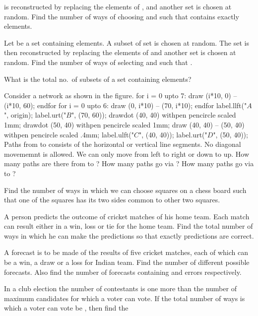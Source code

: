    is reconstructed by replacing the elements of , and another set  is chosen at random. Find
  the number of ways of choosing  and  such that  contains exactly  elements.
\item Let  be a set containing  elements. A subset  of set  is chosen at random. The set
   is then reconstructed by replacing the elements of  and another set  is chosen at
  random. Find the number of ways of selecting  and  such that .
\item What is the total no.\ of subsets of a set containing  elements?
\item Consider a network as shown in the figure.
  \startplacefigure[location={left,none}]
    \startMPcode
      for i = 0 upto 7:
          draw (i*10, 0) -- (i*10, 60);
      endfor
      for i = 0 upto 6:
          draw (0, i*10) -- (70, i*10);
      endfor
      label.llft("$A$", origin);
      label.urt("$B$", (70, 60));
      drawdot (40, 40) withpen pencircle scaled 1mm;
      drawdot (50, 40) withpen pencircle scaled 1mm;
      draw (40, 40) -- (50, 40) withpen pencircle scaled .4mm;
      label.ulft("$C$", (40, 40));
      label.urt("$D$", (50, 40));
    \stopMPcode
  \stopplacefigure
  Paths from  to  consists of the horizontal or vertical line segments. No diagonal movememnt is
  allowed. We can only move from left to right or down to up. How many paths are
  there from  to ? How many paths go via ? How many paths go via  to ?
\vskip 1cm
\item Find the number of ways in which we can choose  squares on a chess board such that one of the
  squares has its two sides common to other two squares.
\item A person predicts the outcome of  cricket matches of his home team. Each match can result either
  in a win, loss or tie for the home team. Find the total number of ways in which he can make the
  predictions so that exactly  predictions
  are correct.
\item A forecast is to be made of the results of five cricket matches, each of which can be a win, a draw or
  a loss for Indian team. Find the number of different possible forecasts. Also find the number of forecasts
  containing  and  errors respectively.
\item In a club election the number of contestants is one more than the number of maximum candidates for
  which a voter can vote. If the total number of ways is which a voter can vote be , then find the
